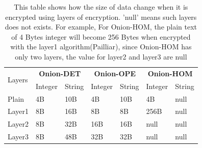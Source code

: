 \begin{table}
\renewcommand{\arraystretch}{1.3}

\label{tab:exampless}
\begin{tabular}{p{0.8cm}|p{0.8cm}p{0.8cm}|p{0.8cm}p{0.8cm}|p{0.8cm}p{0.8cm}}%
\toprule
\multirow{2}{2cm}{Layers} & \multicolumn{2}{c}{\textbf{Onion-DET}} & \multicolumn{2}{c}{\textbf{Onion-OPE}} & \multicolumn{2}{c}{\textbf{Onion-HOM}}\\
\cmidrule{2-7}
& Integer & String & Integer & String & Integer & String\\
\midrule
Plain & 4B & 10B & 4B & 10B & 4B & null \\
Layer1 & 8B & 16B & 8B & 8B & 256B & null \\
Layer2 & 8B & 32B & 16B & 16B & null & null \\
Layer3 & 8B & 48B & 32B & 32B & null & null \\
\bottomrule
\end{tabular}
\caption{This table shows how the size of data change when it is encrypted using layers of encryption. 'null' means such layers does not exists. For example, For Onion-HOM, the plain text of 4 Bytes integer will become 256 Bytes when encrypted with the layer1 algorithm(Pailliar), since Onion-HOM has only two layers, the value for layer2 and layer3 are null}
\end{table}













